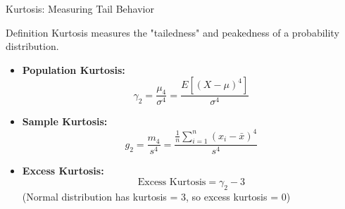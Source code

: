 \documentclass[aspectratio=169,xcolor=dvipsnames,svgnames,x11names,fleqn]{beamer}
\begin{document}
\begin{frame}{Kurtosis: Measuring Tail Behavior}
\begin{block}{Definition}
Kurtosis measures the "tailedness" and peakedness of a probability distribution.
\end{block}

\begin{itemize}
    \item \textbf{Population Kurtosis:}
    $$\gamma_2 = \frac{\mu_4}{\sigma^4} = \frac{E[(X - \mu)^4]}{\sigma^4}$$
    
    \item \textbf{Sample Kurtosis:}
    $$g_2 = \frac{m_4}{s^4} = \frac{\frac{1}{n}\sum_{i=1}^{n}(x_i - \bar{x})^4}{s^4}$$
    
    \item \textbf{Excess Kurtosis:}
    $$\text{Excess Kurtosis} = \gamma_2 - 3$$
    (Normal distribution has kurtosis = 3, so excess kurtosis = 0)
\end{itemize}
\end{frame}
\end{document}

